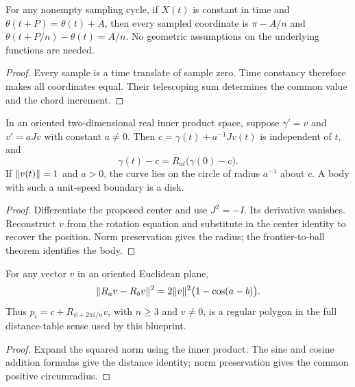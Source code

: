 \begin{lemma}
\label{lem:constant-sampled-angles}
\leanok
{}
For any nonempty sampling cycle, if $X(t)$ is constant in time and
$\theta(t+P)=\theta(t)+A$, then every sampled coordinate is
$\pi-A/n$ and $\theta(t+P/n)-\theta(t)=A/n$.
No geometric assumptions on the underlying functions are needed.
\end{lemma}
\begin{proof}
\leanok
Every sample is a time translate of sample zero. Time constancy therefore
makes all coordinates equal. Their telescoping sum determines the common
value and the chord increment.
\end{proof}

\begin{proposition}
\label{prop:rotating-velocity-circle}
\leanok
{}
In an oriented two-dimensional real inner product space, suppose
$\gamma'=v$ and $v'=aJv$ with constant $a\ne0$. Then
$c=\gamma(t)+a^{-1}Jv(t)$ is independent of $t$, and
\[
 \gamma(t)-c=R_{at}\bigl(\gamma(0)-c\bigr).
\]
If $\lVert v(t)\rVert=1$ and $a>0$, the curve lies on the circle of radius
$a^{-1}$ about $c$. A body with such a unit-speed boundary is a disk.
\end{proposition}
\begin{proof}
\leanok
Differentiate the proposed center and use $J^2=-I$. Its derivative vanishes.
Reconstruct $v$ from the rotation equation and substitute in the center
identity to recover the position. Norm preservation gives the radius;
the frontier-to-ball theorem identifies the body.
\end{proof}

\begin{lemma}
\label{lem:rotation-distance-regularity}
\leanok
{}
For any vector $v$ in an oriented Euclidean plane,
\[
 \lVert R_a v-R_b v\rVert^2=2\lVert v\rVert^2\bigl(1-\cos(a-b)\bigr).
\]
Thus $p_i=c+R_{\phi+2\pi i/n}v$, with $n\geq3$ and $v\ne0$, is a
regular polygon in the full distance-table sense used by this blueprint.
\end{lemma}
\begin{proof}
\leanok
Expand the squared norm using the inner product. The sine and cosine
addition formulas give the distance identity; norm preservation gives
the common positive circumradius.
\end{proof}

